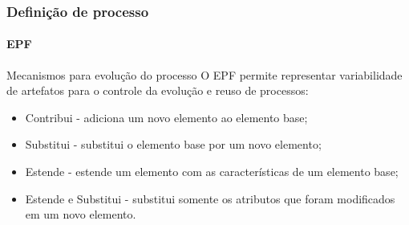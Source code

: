 \begin{frame}
	\frametitle{Definição de processo}
	\framesubtitle{EPF}
	
	\begin{block:concept}{Mecanismos para evolução do processo}
		O EPF permite representar variabilidade de artefatos para o controle da evolução e reuso de processos:

		\begin{itemize}
			\item Contribui - adiciona um novo elemento ao elemento base;

			\item Substitui - substitui o elemento base por um novo elemento;

			\item Estende - estende um elemento com as características de um elemento base;

			\item Estende e Substitui - substitui somente os atributos que foram modificados em um novo elemento.
		\end{itemize}
	\end{block:concept}
\end{frame}

%	
%
%
%	
%	


